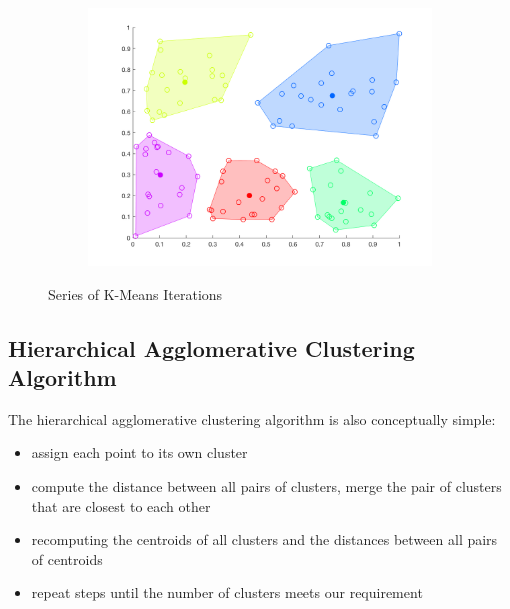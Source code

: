 \documentclass[12pt]{article}
\begin{document}
\begin{figure}[t!]
\begin{subfigure}[b]{0.25\textwidth}
    \end{subfigure}
    \begin{subfigure}[b]{0.25\textwidth}
        \includegraphics[width=\textwidth]{k-means_11}
    \end{subfigure}
    \caption{Series of K-Means Iterations}\label{fig:K-Means}
\end{figure}

\subsection{Hierarchical Agglomerative Clustering Algorithm}
The hierarchical agglomerative clustering algorithm is also conceptually simple:
\begin{itemize}
	\item assign each point to its own cluster
	\item compute the distance between all pairs of clusters, merge the pair of clusters that are closest to each other
  	\item recomputing the centroids of all clusters and the distances between all pairs of centroids
  	\item repeat steps until the number of clusters meets our requirement
\end{itemize}
\end{document}
